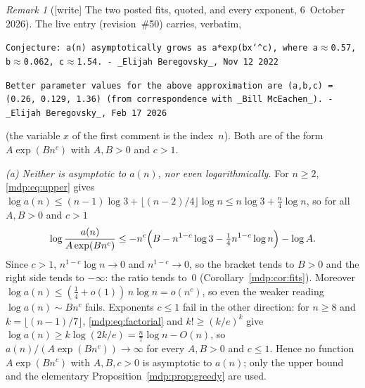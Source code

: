 \documentclass[11pt,letterpaper]{article}
\numberwithin{equation}{section}
\theoremstyle{remark}\newtheorem{remark}[theorem]{Remark}
\begin{document}
\begin{remark}[{[write]} The two posted fits, quoted, and every exponent, 6~October 2026]\label{mdp:rem:fits}
The live entry (revision~\#50) carries, verbatim,
\begin{center}\small
\parbox{0.92\textwidth}{\raggedright\texttt{Conjecture: a(n) asymptotically grows as a*exp(bx\char`\^{}c), where a$\approx$0.57, b$\approx$0.062, c$\approx$1.54. - \_Elijah Beregovsky\_, Nov 12 2022}}

\smallskip
\parbox{0.92\textwidth}{\raggedright\texttt{Better parameter values for the above approximation are (a,b,c) = (0.26, 0.129, 1.36) (from correspondence with \_Bill McEachen\_). - \_Elijah Beregovsky\_, Feb 17 2026}}
\end{center}
(the variable $x$ of the first comment is the index~$n$). Both are of the
form $A\exp(Bn^c)$ with $A,B>0$ and $c>1$.

\emph{(a) Neither is asymptotic to $a(n)$, nor even logarithmically.}
For $n\ge2$, \eqref{mdp:eq:upper} gives
$\log a(n)\le(n-1)\log3+\lfloor(n-2)/4\rfloor\log n\le n\log3+\tfrac n4\log n$,
so for all $A,B>0$ and $c>1$
\[
 \log\frac{a(n)}{A\exp(Bn^c)}
 \le-n^c\Bigl(B-n^{1-c}\log3-\tfrac14n^{1-c}\log n\Bigr)-\log A .
\]
Since $c>1$, $n^{1-c}\log n\to0$ and $n^{1-c}\to0$, so the bracket tends
to $B>0$ and the right side tends to $-\infty$: the ratio tends to~$0$
(Corollary~\ref{mdp:cor:fits}). Moreover
$\log a(n)\le(\tfrac14+o(1))\,n\log n=o(n^c)$, so even the weaker reading
$\log a(n)\sim Bn^c$ fails. Exponents $c\le1$ fail in the other direction:
for $n\ge8$ and $k=\lfloor(n-1)/7\rfloor$, \eqref{mdp:eq:factorial} and
$k!\ge(k/e)^k$ give $\log a(n)\ge k\log(2k/e)=\tfrac n7\log n-O(n)$, so
$a(n)/(A\exp(Bn^c))\to\infty$ for every $A,B>0$ and $c\le1$. Hence no
function $A\exp(Bn^c)$ with $A,B,c>0$ is asymptotic to $a(n)$; only the
upper bound and the elementary Proposition~\ref{mdp:prop:greedy} are used.


\end{remark}
\end{document}
